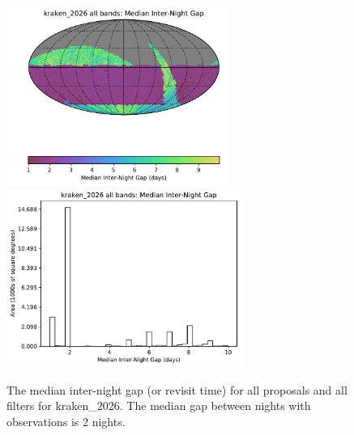 \documentclass[DM,lsstdraft,authoryear,toc]{lsstdoc}
\begin{document}
\begin{figure}[htb]
\centering
\vskip -0.0in
\includegraphics[height=2.3in]{figures/kraken_2026_Median_Inter-Night_Gap_all_bands_HEAL_SkyMap.pdf}
\includegraphics[height=2.3in]{figures/kraken_2026_Median_Inter-Night_Gap_all_bands_HEAL_Histogram.pdf}
\vskip -0.1in
\caption{The median inter-night gap (or revisit time)  for all proposals and all filters for kraken\_2026.
The median gap between nights with observations is 2 nights.
\label{fig:baseline_GapAll}}
\end{figure}
\end{document}
